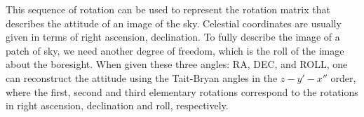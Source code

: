 This sequence of rotation can be used to represent the rotation matrix that describes the attitude of an image of the sky. Celestial coordinates are usually given in terms of right ascension, declination. To fully describe the image of a patch of sky, we need another degree of freedom, which is the roll of the image about the boresight. When given these three angles: RA, DEC, and ROLL, one can reconstruct the attitude using the Tait-Bryan angles in the $z-y'-x''$ order, where the first, second and third elementary rotations correspond to the rotations in right ascension, declination and roll, respectively.

\begin{figure}[!ht]
	\centering
	
	\caption{}
	\label{fig:celestialSphere}
    \end{figure}
    
% 	

\begin{figure}[!ht]
	\centering
	
	\caption{}
	\label{fig:AzEl}
    \end{figure}


